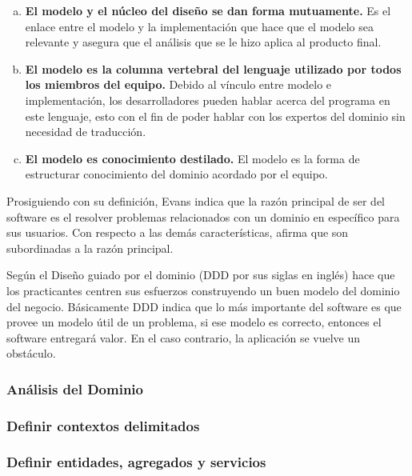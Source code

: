\vspace{-1em}
\begin{enumerate}[a.]
  \item \textbf{El modelo y el núcleo del diseño se dan forma mutuamente.}
    Es el enlace entre el modelo y la implementación que hace que el modelo sea relevante y asegura que el
    análisis que se le hizo aplica al producto final.
  \item \textbf{El modelo es la columna vertebral del lenguaje utilizado por todos los miembros del equipo.}
    Debido al vínculo entre modelo e implementación, los desarrolladores pueden hablar acerca del
    programa en este lenguaje, esto con el fin de poder hablar con los expertos del dominio sin
    necesidad de traducción.
  \item \textbf{El modelo es conocimiento destilado.}
    El modelo es la forma de estructurar conocimiento del dominio acordado por el equipo.
\end{enumerate}
\vspace{-1em}

Prosiguiendo con su definición, Evans indica que la razón principal de ser del software es el
resolver problemas relacionados con un dominio en específico para sus usuarios.
Con respecto a las demás características, afirma que son subordinadas a la razón principal.

Según \cite{percival2020architecture} el Diseño guiado por el dominio (DDD por sus siglas en inglés)
hace que los practicantes centren sus esfuerzos construyendo un buen modelo del dominio del negocio.
Básicamente DDD indica que lo más importante del software es que provee un modelo útil de un problema,
si ese modelo es correcto, entonces el software entregará valor.
En el caso contrario, la aplicación se vuelve un obstáculo.


\subsubsection{Análisis del Dominio}


\subsubsection{Definir contextos delimitados}


\subsubsection{Definir entidades, agregados y servicios}


